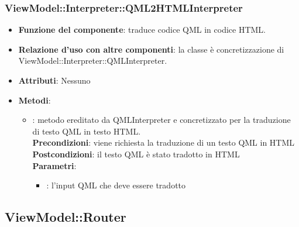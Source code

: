 \subsubsection{ViewModel::Interpreter::QML2HTMLInterpreter}
\begin{itemize}
\item\textbf{Funzione del componente}: traduce codice QML in codice HTML.
	\item\textbf{Relazione d'uso con altre componenti}: la classe è concretizzazione di ViewModel::Interpreter::QMLInterpreter.\\
\item\textbf{Attributi}: Nessuno
\item\textbf{Metodi}:
	\begin{itemize}
		\item{}: metodo ereditato da QMLInterpreter e concretizzato per la traduzione di testo QML in testo HTML.\\
		\textbf{Precondizioni}: viene richiesta la traduzione di un testo QML in HTML\\
		\textbf{Postcondizioni}: il testo QML è stato tradotto in HTML\\
		\textbf{Parametri}:
			\begin{itemize}
				\item{}: l'input QML che deve essere tradotto \\
			\end{itemize}
	\end{itemize}
\end{itemize}

\subsection{ViewModel::Router}
